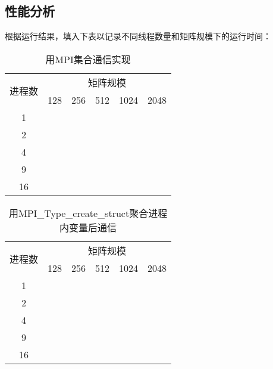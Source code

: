 \documentclass{SYSUReport}
\begin{document}
\subsection{性能分析}
根据运行结果，填入下表以记录不同线程数量和矩阵规模下的运行时间：
\begin{table}[H]
\centering
\caption{用MPI集合通信实现}
\label{表1}
\begin{tabular}{|c|lllll|}
\hline
\multirow{2}{*}{进程数} & \multicolumn{5}{c|}{矩阵规模}                                                                        \\ \cline{2-6} 
 & \multicolumn{1}{l|}{128} & \multicolumn{1}{l|}{256} & \multicolumn{1}{l|}{512} & \multicolumn{1}{l|}{1024} & 2048 \\ \hline
1                    & \multicolumn{1}{l|}{} & \multicolumn{1}{l|}{} & \multicolumn{1}{l|}{} & \multicolumn{1}{l|}{} &  \\ \hline
2                    & \multicolumn{1}{l|}{} & \multicolumn{1}{l|}{} & \multicolumn{1}{l|}{} & \multicolumn{1}{l|}{} &  \\ \hline
4                    & \multicolumn{1}{l|}{} & \multicolumn{1}{l|}{} & \multicolumn{1}{l|}{} & \multicolumn{1}{l|}{} &  \\ \hline
9                    & \multicolumn{1}{l|}{} & \multicolumn{1}{l|}{} & \multicolumn{1}{l|}{} & \multicolumn{1}{l|}{} &  \\ \hline
16                   & \multicolumn{1}{l|}{} & \multicolumn{1}{l|}{} & \multicolumn{1}{l|}{} & \multicolumn{1}{l|}{} &  \\ \hline
\end{tabular}
\end{table}

\begin{table}[H]
\centering
\caption{用MPI\_Type\_create\_struct聚合进程内变量后通信}
\label{表2}
\begin{tabular}{|c|lllll|}
\hline
\multirow{2}{*}{进程数} & \multicolumn{5}{c|}{矩阵规模}                                                                        \\ \cline{2-6} 
 & \multicolumn{1}{l|}{128} & \multicolumn{1}{l|}{256} & \multicolumn{1}{l|}{512} & \multicolumn{1}{l|}{1024} & 2048 \\ \hline
1                    & \multicolumn{1}{l|}{} & \multicolumn{1}{l|}{} & \multicolumn{1}{l|}{} & \multicolumn{1}{l|}{} &  \\ \hline
2                    & \multicolumn{1}{l|}{} & \multicolumn{1}{l|}{} & \multicolumn{1}{l|}{} & \multicolumn{1}{l|}{} &  \\ \hline
4                    & \multicolumn{1}{l|}{} & \multicolumn{1}{l|}{} & \multicolumn{1}{l|}{} & \multicolumn{1}{l|}{} &  \\ \hline
9                    & \multicolumn{1}{l|}{} & \multicolumn{1}{l|}{} & \multicolumn{1}{l|}{} & \multicolumn{1}{l|}{} &  \\ \hline
16                   & \multicolumn{1}{l|}{} & \multicolumn{1}{l|}{} & \multicolumn{1}{l|}{} & \multicolumn{1}{l|}{} &  \\ \hline
\end{tabular}
\end{table}
\end{document}
